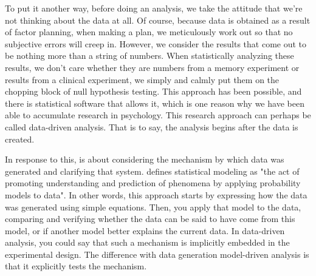 \documentclass{ltjsbook}
\begin{document}
To put it another way, before doing an analysis, we take the attitude that we're not thinking about the data at all. Of course, because data is obtained as a result of factor planning, when making a plan, we meticulously work out so that no subjective errors will creep in. However, we consider the results that come out to be nothing more than a string of numbers. When statistically analyzing these results, we don't care whether they are numbers from a memory experiment or results from a clinical experiment, we simply and calmly put them on the chopping block of null hypothesis testing. This approach has been possible, and there is statistical software that allows it, which is one reason why we have been able to accumulate research in psychology. This research approach can perhaps be called data-driven analysis. That is to say, the analysis begins after the data is created.

In response to this,  is about considering the mechanism by which data was generated and clarifying that system. \textcite{Matsuura201610} defines statistical modeling as "the act of promoting understanding and prediction of phenomena by applying probability models to data". In other words, this approach starts by expressing how the data was generated using simple equations. Then, you apply that model to the data, comparing and verifying whether the data can be said to have come from this model, or if another model better explains the current data. In data-driven analysis, you could say that such a mechanism is implicitly embedded in the experimental design. The difference with data generation model-driven analysis is that it explicitly tests the mechanism.
\end{document}
